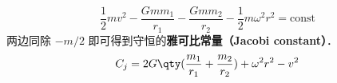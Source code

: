 

\begin{equation}
\frac{1}{2}mv^2 - \frac{Gmm_1}{r_1} - \frac{Gmm_2}{r_2} - \frac{1}{2}m\omega^2 r^2 = \text{const}
\end{equation}
两边同除 $-m/2$ 即可得到守恒的\textbf{雅可比常量（Jacobi constant）}．
\begin{equation}\label{JacCon_eq1}
C_j = 2G\qty(\frac{m_1}{r_1} + \frac{m_2}{r_2}) + \omega^2 r^2 - v^2
\end{equation}
